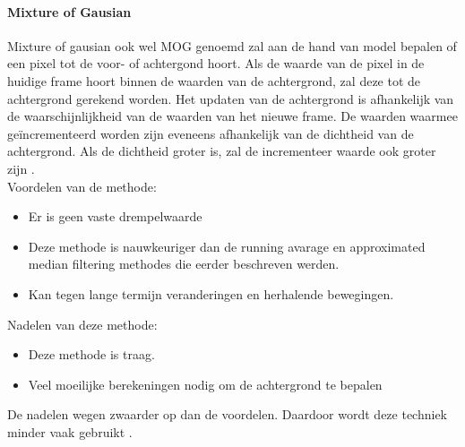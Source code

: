 \paragraph{Mixture of Gausian}
\label{refMOG}
Mixture of gausian ook wel MOG genoemd zal aan de hand van model bepalen of een pixel tot de voor- of achtergond hoort. Als de waarde van de pixel in de huidige frame hoort binnen de waarden van de achtergrond, zal deze tot de achtergrond gerekend worden. Het updaten van de achtergrond is afhankelijk van de waarschijnlijkheid van de waarden van het nieuwe frame. De waarden waarmee ge\"incrementeerd worden zijn eveneens afhankelijk van de dichtheid van de achtergrond. Als de dichtheid groter is, zal de incrementeer waarde ook groter zijn \cite{bibSDB}. \\
Voordelen van de methode:
\begin{itemize}
	\item Er is geen vaste drempelwaarde
	\item Deze methode is nauwkeuriger dan de running avarage en approximated median filtering methodes die eerder beschreven werden.
	\item Kan tegen lange termijn veranderingen en herhalende bewegingen.
\end{itemize}
Nadelen van deze methode:
\begin{itemize}
	\item Deze methode is traag.
	\item Veel moeilijke berekeningen nodig om de achtergrond te bepalen
\end{itemize}
De nadelen wegen zwaarder op dan de voordelen. Daardoor wordt deze techniek minder vaak gebruikt \cite{bibSDB}.

